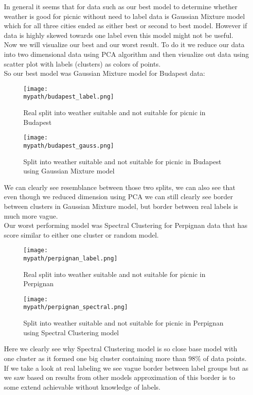 \documentclass[a4paper]{article}
\begin{document}
	In general it seems that for data such as our best model to determine whether weather is good for picnic without need to label data is Gaussian Mixture model which for all three cities ended as either best or second to best model. However if data is highly skewed towards one label even this model might not be useful.
	\\
	
	Now we will visualize our best and our worst result. To do it we reduce our data into two dimensional data using PCA algorithm and then visualize out data using scatter plot with labels (clusters) as colors of points.
	\\
	
	So our best model was Gaussian Mixture model for Budapest data:
	
	\begin{figure}[h!]
		\centerline{\texttt{[image: \\mypath/budapest\_label.png]}}
		\caption{Real split into weather suitable and not suitable for picnic in Budapest}
	\end{figure}
	
	\begin{figure}[h!]
		\centerline{\texttt{[image: \\mypath/budapest\_gauss.png]}}
		\caption{Split into weather suitable and not suitable for picnic in Budapest using Gaussian Mixture model}
	\end{figure}

	We can clearly see resemblance between those two splits, we can also see that even though we reduced dimension using PCA we can still clearly see border between clusters in Gaussian Mixture model, but border between real labels is much more vague.
	\\
	
	Our worst performing model was Spectral Clustering for Perpignan data that has score similar to either one cluster or random model.
	
	\begin{figure}[h!]
		\centerline{\texttt{[image: \\mypath/perpignan\_label.png]}}
		\caption{Real split into weather suitable and not suitable for picnic in Perpignan}
	\end{figure}
	
	\begin{figure}[h!]
		\centerline{\texttt{[image: \\mypath/perpignan\_spectral.png]}}
		\caption{Split into weather suitable and not suitable for picnic in Perpignan using Spectral Clustering model}
	\end{figure}
	
	Here we clearly see why Spectral Clustering model is so close base model with one cluster as it formed one big cluster containing more than 98\% of data points. If we take a look at real labeling we see vague border between label groups but as we saw based on results from other models approximation of this border is to some extend achievable without knowledge of labels.
	
\end{document}
